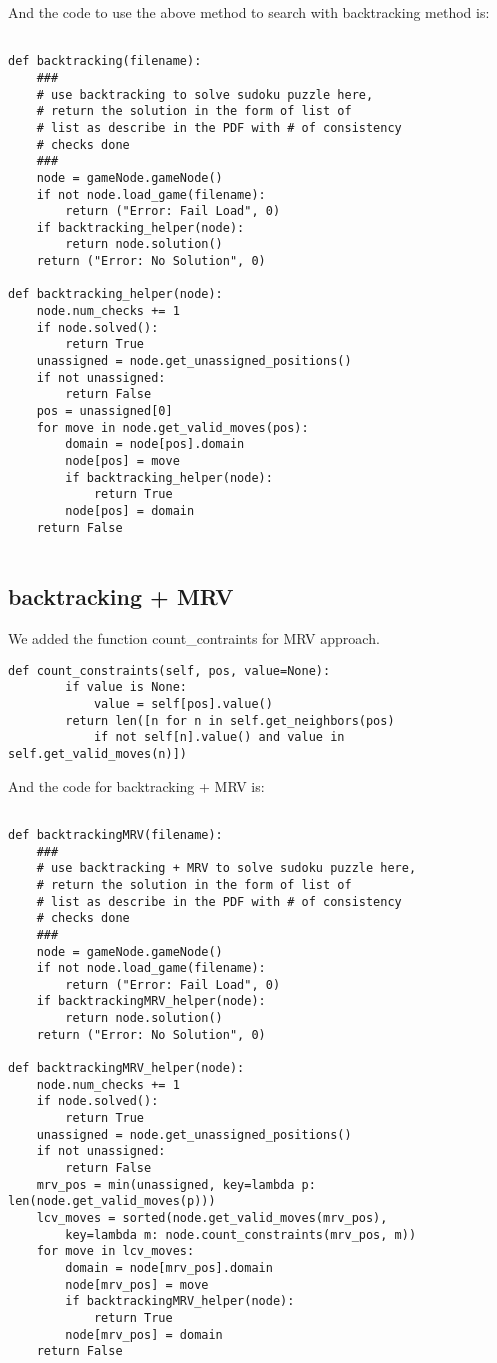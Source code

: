 \documentclass[11pt]{article}
\begin{document}
And the code to use the above method to search with backtracking method is:
\lstset{language=Python}
\begin{lstlisting}[frame=single]

def backtracking(filename):
	###
	# use backtracking to solve sudoku puzzle here,
	# return the solution in the form of list of
	# list as describe in the PDF with # of consistency
	# checks done
	###
	node = gameNode.gameNode()
	if not node.load_game(filename):
		return ("Error: Fail Load", 0)
	if backtracking_helper(node):
		return node.solution()
	return ("Error: No Solution", 0)

def backtracking_helper(node):
	node.num_checks += 1
	if node.solved():
		return True
	unassigned = node.get_unassigned_positions()
	if not unassigned:
		return False
	pos = unassigned[0]
	for move in node.get_valid_moves(pos):
		domain = node[pos].domain
		node[pos] = move
		if backtracking_helper(node):
			return True
		node[pos] = domain
	return False
	
\end{lstlisting}

\subsection {backtracking + MRV}

We added the function count\_contraints for MRV approach.
\lstset{language=Python}
\begin{lstlisting}[frame=single]
	def count_constraints(self, pos, value=None):
		if value is None:
			value = self[pos].value()
		return len([n for n in self.get_neighbors(pos)
			if not self[n].value() and value in self.get_valid_moves(n)])
\end{lstlisting}

And the code for backtracking + MRV is:
\lstset{language=Python}
\begin{lstlisting}[frame=single]

def backtrackingMRV(filename):
	###
	# use backtracking + MRV to solve sudoku puzzle here,
	# return the solution in the form of list of
	# list as describe in the PDF with # of consistency
	# checks done
	###
	node = gameNode.gameNode()
	if not node.load_game(filename):
		return ("Error: Fail Load", 0)
	if backtrackingMRV_helper(node):
		return node.solution()
	return ("Error: No Solution", 0)

def backtrackingMRV_helper(node):
	node.num_checks += 1
	if node.solved():
		return True
	unassigned = node.get_unassigned_positions()
	if not unassigned:
		return False
	mrv_pos = min(unassigned, key=lambda p: len(node.get_valid_moves(p)))
	lcv_moves = sorted(node.get_valid_moves(mrv_pos),
		key=lambda m: node.count_constraints(mrv_pos, m))
	for move in lcv_moves:
		domain = node[mrv_pos].domain
		node[mrv_pos] = move
		if backtrackingMRV_helper(node):
			return True
		node[mrv_pos] = domain
	return False
	
\end{lstlisting}
\end{document}

